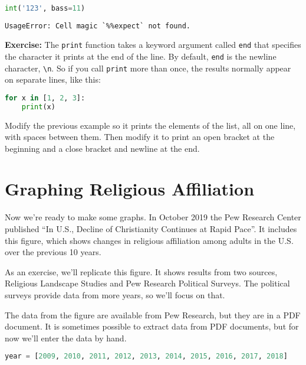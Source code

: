 \begin{lstlisting}[language=Python,style=source]
%%expect TypeError

int('123', bass=11)
\end{lstlisting}

\begin{lstlisting}[style=output]
UsageError: Cell magic `%%expect` not found.
\end{lstlisting}

\textbf{Exercise:} The \passthrough{\lstinline!print!} function takes a
keyword argument called \passthrough{\lstinline!end!} that specifies the
character it prints at the end of the line. By default,
\passthrough{\lstinline!end!} is the newline character,
\passthrough{\lstinline!\\n!}. So if you call
\passthrough{\lstinline!print!} more than once, the results normally
appear on separate lines, like this:

\begin{lstlisting}[language=Python,style=source]
for x in [1, 2, 3]:
    print(x)
\end{lstlisting}

Modify the previous example so it prints the elements of the list, all
on one line, with spaces between them. Then modify it to print an open
bracket at the beginning and a close bracket and newline at the end.

\hypertarget{graphing-religious-affiliation}{%
\section{Graphing Religious
Affiliation}\label{graphing-religious-affiliation}}

Now we're ready to make some graphs. In October 2019 the Pew Research
Center published ``In U.S., Decline of Christianity Continues at Rapid
Pace''. It includes this figure, which shows changes in religious
affiliation among adults in the U.S. over the previous 10 years.

As an exercise, we'll replicate this figure. It shows results from two
sources, Religious Landscape Studies and Pew Research Political Surveys.
The political surveys provide data from more years, so we'll focus on
that.

The data from the figure are available from Pew Research, but they are
in a PDF document. It is sometimes possible to extract data from PDF
documents, but for now we'll enter the data by hand.

\begin{lstlisting}[language=Python,style=source]
year = [2009, 2010, 2011, 2012, 2013, 2014, 2015, 2016, 2017, 2018]
\end{lstlisting}

